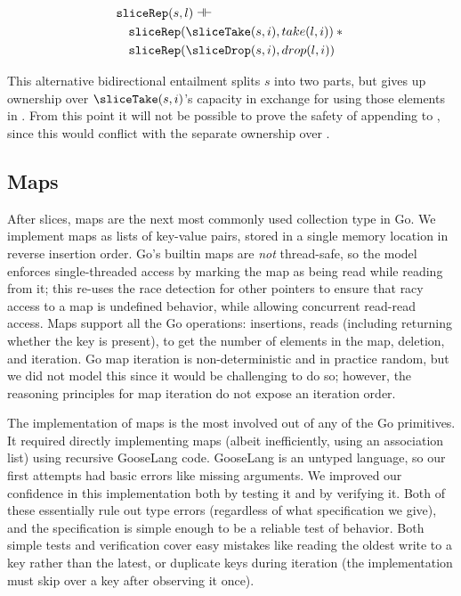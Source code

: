 \begin{align*}
  &\sliceRep(s, l) \dashv\vdash \\
  &\quad \sliceRep(\sliceTake(s, i), take(l, i)) \sep {} \\
  &\quad \sliceRep(\sliceDrop(s, i), drop(l, i))
\end{align*}

This alternative bidirectional entailment splits $s$ into two parts,
but gives up ownership over $\sliceTake(s, i)$'s capacity in exchange
for using those elements in . From this point it will
not be possible to prove the safety of appending to ,
since this would conflict with the separate ownership over
.

\subsection{Maps}


After slices, maps are the next most commonly used collection type in
Go. We implement maps as lists of key-value pairs, stored in a single
memory location in reverse insertion order. Go's builtin maps are
\emph{not} thread-safe, so the model enforces single-threaded access by
marking the map as being read while reading from it; this re-uses the
race detection for other pointers to ensure that racy access to a map is
undefined behavior, while allowing concurrent read-read access. Maps
support all the Go operations: insertions, reads (including returning
whether the key is present),  to get the number of elements
in the map, deletion, and iteration. Go map iteration is
non-deterministic and in practice random, but we did not model this
since it would be challenging to do so; however, the reasoning
principles for map iteration do not expose an iteration order.

The implementation of maps is the most involved out of any of the Go
primitives. It required directly implementing maps (albeit
inefficiently, using an association list) using recursive GooseLang
code. GooseLang is an untyped language, so our first attempts had basic
errors like missing arguments. We improved our confidence in this
implementation both by testing it and by verifying it. Both of these
essentially rule out type errors (regardless of what specification we give),
and the specification is simple enough
to be a reliable test of behavior. Both simple tests and verification
cover easy mistakes like reading the oldest write to a key rather than
the latest, or duplicate keys during iteration (the implementation must
skip over a key after observing it once).

